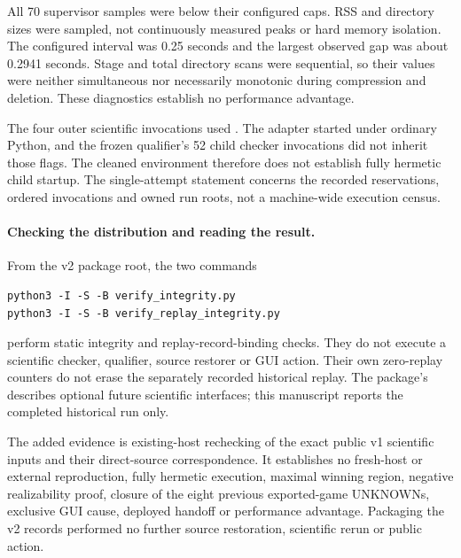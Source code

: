 All 70 supervisor samples were below their configured caps.
RSS and directory sizes were sampled, not continuously measured peaks
or hard memory isolation. The configured interval was 0.25 seconds and the
largest observed gap was about 0.2941 seconds. Stage and total directory scans
were sequential, so their values were neither simultaneous nor necessarily
monotonic during compression and deletion. These diagnostics establish
no performance advantage.

The four outer scientific invocations used .
The adapter started under ordinary Python, and the frozen qualifier's
52 child checker invocations did not inherit those flags.
The cleaned environment therefore does not establish fully hermetic
child startup. The single-attempt statement concerns the recorded
reservations, ordered invocations and owned run roots, not a
machine-wide execution census.

\paragraph{Checking the distribution and reading the result.}
From the v2 package root, the two commands
\begin{verbatim}
python3 -I -S -B verify_integrity.py
python3 -I -S -B verify_replay_integrity.py
\end{verbatim}
perform static integrity and replay-record-binding checks.
They do not execute a scientific checker, qualifier, source restorer
or GUI action. Their own zero-replay counters do not erase the separately
recorded historical replay. The package's
 describes optional future scientific
interfaces; this manuscript reports the completed historical run only.

The added evidence is existing-host rechecking of the exact public v1
scientific inputs and their direct-source correspondence.
It establishes no fresh-host or external reproduction, fully hermetic
execution, maximal winning region, negative realizability proof,
closure of the eight previous exported-game UNKNOWNs, exclusive GUI cause,
deployed handoff or performance advantage. Packaging the v2 records
performed no further source restoration, scientific rerun or public action.


